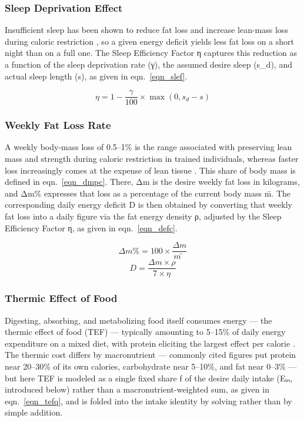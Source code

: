 \subsubsection{Sleep Deprivation Effect}

Insufficient sleep has been shown to reduce fat loss and increase lean-mass loss during caloric restriction \cite{ref_nedeltcheva2010}, so a given energy deficit yields less fat loss on a short night than on a full one. The Sleep Efficiency Factor η captures this reduction as a function of the sleep deprivation rate (γ), the assumed desire sleep (s\_d), and actual sleep length (s), as given in eqn.~\eqref{eqn_slef}.

\begin{equation}
\label{eqn_slef}
η = 1 − \frac{γ}{100} × \max(0, s_{d} − s)
\end{equation}

\subsubsection{Weekly Fat Loss Rate}

A weekly body-mass loss of 0.5–1\% is the range associated with preserving lean mass and strength during caloric restriction in trained individuals, whereas faster loss increasingly comes at the expense of lean tissue \cite{ref_garthe2011}. This share of body mass is defined in eqn.~\eqref{eqn_dmpc}. There, Δm is the desire weekly fat loss in kilograms, and Δm\% expresses that loss as a percentage of the current body mass m̄. The corresponding daily energy deficit D is then obtained by converting that weekly fat loss into a daily figure via the fat energy density ρ, adjusted by the Sleep Efficiency Factor η, as given in eqn.~\eqref{eqn_defc}.

\begin{equation}
\label{eqn_dmpc}
Δm\% = 100 × \frac{Δm}{m̄}
\end{equation}
\begin{equation}
\label{eqn_defc}
D = \frac{Δm × ρ}{7 × η}
\end{equation}

\subsubsection{Thermic Effect of Food}

Digesting, absorbing, and metabolizing food itself consumes energy — the thermic effect of food (TEF) — typically amounting to 5–15\% of daily energy expenditure on a mixed diet, with protein eliciting the largest effect per calorie \cite{ref_westerterp2004}. The thermic cost differs by macronutrient — commonly cited figures put protein near 20–30\% of its own calories, carbohydrate near 5–10\%, and fat near 0–3\% \cite{ref_westerterp2004} — but here TEF is modeled as a single fixed share f of the desire daily intake (Eᵢₙ, introduced below) rather than a macronutrient-weighted sum, as given in eqn.~\eqref{eqn_tefq}, and is folded into the intake identity by solving rather than by simple addition.

